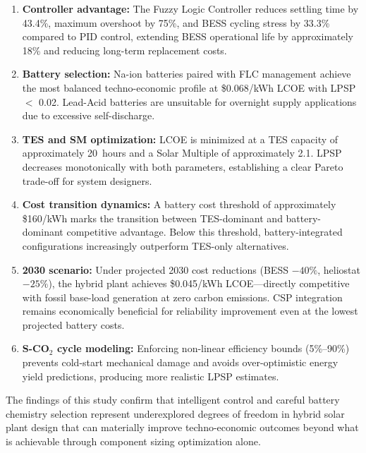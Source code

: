 \documentclass[journal]{IEEEtran}
\begin{document}
\begin{enumerate}
    \item \textbf{Controller advantage:} The Fuzzy Logic Controller reduces settling time by 43.4\%, maximum overshoot by 75\%, and BESS cycling stress by 33.3\% compared to PID control, extending BESS operational life by approximately 18\% and reducing long-term replacement costs.

    \item \textbf{Battery selection:} Na-ion batteries paired with FLC management achieve the most balanced techno-economic profile at \$0.068/kWh LCOE with LPSP $<$ 0.02. Lead-Acid batteries are unsuitable for overnight supply applications due to excessive self-discharge.

    \item \textbf{TES and SM optimization:} LCOE is minimized at a TES capacity of approximately 20~hours and a Solar Multiple of approximately 2.1. LPSP decreases monotonically with both parameters, establishing a clear Pareto trade-off for system designers.

    \item \textbf{Cost transition dynamics:} A battery cost threshold of approximately \$160/kWh marks the transition between TES-dominant and battery-dominant competitive advantage. Below this threshold, battery-integrated configurations increasingly outperform TES-only alternatives.

    \item \textbf{2030 scenario:} Under projected 2030 cost reductions (BESS $-40\%$, heliostat $-25\%$), the hybrid plant achieves \$0.045/kWh LCOE---directly competitive with fossil base-load generation at zero carbon emissions. CSP integration remains economically beneficial for reliability improvement even at the lowest projected battery costs.

    \item \textbf{S-CO$_2$ cycle modeling:} Enforcing non-linear efficiency bounds (5\%--90\%) prevents cold-start mechanical damage and avoids over-optimistic energy yield predictions, producing more realistic LPSP estimates.
\end{enumerate}

The findings of this study confirm that intelligent control and careful battery chemistry selection represent underexplored degrees of freedom in hybrid solar plant design that can materially improve techno-economic outcomes beyond what is achievable through component sizing optimization alone. 
\appendices
\end{document}
